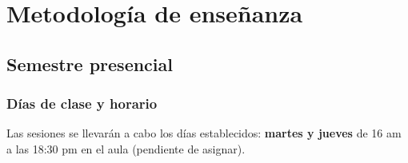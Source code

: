 \documentclass[12pt]{beamer}
\begin{document}
\section{Metodología de enseñanza}
\subsection{Semestre presencial}

\begin{frame}
\frametitle{Días de clase y horario}
Las sesiones se llevarán a cabo los días establecidos: \textbf{martes y jueves} de 16 am a las 18:30 pm en el aula (pendiente de asignar).
\end{frame}

\end{document}
